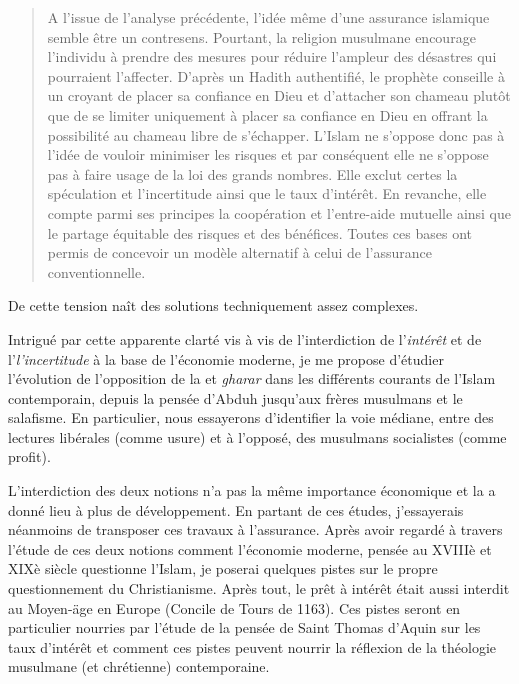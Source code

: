 \begin{quote}
     
A l'issue de l'analyse précédente, l'idée même d'une assurance islamique semble être un contresens. Pourtant, la religion musulmane encourage l'individu à prendre des mesures pour réduire l'ampleur des désastres qui pourraient l'affecter. D'après un Hadith authentifié, le prophète conseille à un croyant de placer sa confiance en Dieu et d'attacher son chameau plutôt que de se limiter uniquement à placer sa confiance en Dieu en offrant la possibilité au chameau libre de s'échapper. L'Islam ne s'oppose donc pas à l'idée de vouloir minimiser les risques et par conséquent elle ne s'oppose pas à faire usage de la loi des grands nombres. Elle exclut certes la spéculation et l'incertitude ainsi que le taux d'intérêt. En revanche, elle compte parmi ses principes la coopération et l'entre-aide mutuelle ainsi que le partage équitable des risques et des bénéfices. Toutes ces bases ont permis de concevoir un modèle alternatif à celui de l'assurance conventionnelle.
\end{quote}
De cette tension naît des solutions techniquement assez complexes.


Intrigué par cette apparente clarté vis à vis de l'interdiction de l'\textit{intérêt} et de l'\textit{l'incertitude} à la base de l'économie moderne, je me propose d'étudier l'évolution de l'opposition de la \emph{\riba} et \emph{gharar} dans les différents courants de l'Islam contemporain, depuis la pensée d'Abduh jusqu'aux frères musulmans et le salafisme. En particulier, nous essayerons d'identifier la voie médiane, entre des lectures libérales (\riba comme usure) et à l'opposé, des musulmans socialistes (\riba comme profit).

L'interdiction des deux notions n'a pas la même importance économique et la \textit{\riba} a donné lieu à plus de développement. En partant de ces études, j'essayerais néanmoins de transposer ces travaux à l'assurance.
Après avoir regardé  à travers l'étude de ces deux notions comment l'économie moderne, pensée au XVIIIè et XIXè siècle questionne l'Islam, je poserai quelques pistes sur le propre questionnement du Christianisme. Après tout, le prêt à intérêt était aussi interdit au Moyen-äge en Europe (Concile de Tours de 1163). Ces pistes seront en particulier nourries par l'étude de la pensée de Saint Thomas d'Aquin sur les taux d'intérêt et comment ces pistes peuvent nourrir la réflexion de la théologie musulmane (et chrétienne) contemporaine. 
 

